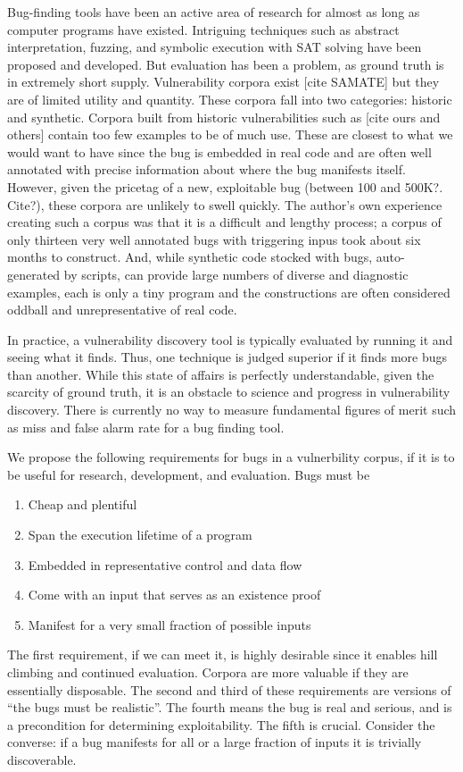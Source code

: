 Bug-finding tools have been an active area of research for almost as long as computer programs have existed. 
Intriguing techniques such as abstract interpretation, fuzzing, and symbolic execution with SAT solving have been proposed and developed.
But evaluation has been a problem, as  ground truth is in extremely short supply.
Vulnerability corpora exist [cite SAMATE] but they are of limited utility and quantity.
These corpora fall into two categories: historic and synthetic.
Corpora built from historic vulnerabilities such as [cite ours and others] contain too few examples to be of much use.
These are closest to what we would want to have since the bug is embedded in real code and are often well annotated with precise information about where the bug manifests itself.
However, given the pricetag of a new, exploitable bug (between 100 and 500K?. Cite?), these corpora are unlikely to swell quickly.
The author's own experience creating such a corpus was that it is a difficult and lengthy process; a corpus of only thirteen very well annotated bugs with triggering inpus took about six months to construct. 
And, while synthetic code stocked with bugs, auto-generated by scripts, can provide large numbers of diverse and diagnostic examples, each is only a tiny program and the constructions are often considered oddball and unrepresentative of real code.

In practice, a vulnerability discovery tool is typically evaluated by running it and seeing what it finds. 
Thus, one technique is judged superior if it finds more bugs than another.
While this state of affairs is perfectly understandable, given the scarcity of ground truth, it is an obstacle to science and progress in vulnerability discovery.
There is currently no way to measure fundamental figures of merit such as miss and false alarm rate for a bug finding tool.

We propose the following requirements for bugs in a vulnerbility corpus, if it is to be useful for research, development, and evaluation.
Bugs must be
\begin{enumerate}
\item Cheap and plentiful
\item Span the execution lifetime of a program
\item Embedded in representative control and data flow
\item Come with an input that serves as an existence proof 
\item Manifest for a very small fraction of possible inputs
\end {enumerate}
The first requirement, if we can meet it, is highly desirable since it enables hill climbing and continued evaluation.
Corpora are more valuable if they are essentially disposable. 
The second and third of these requirements are versions of ``the bugs must be realistic''.
The fourth means the bug is real and serious, and is a precondition for determining exploitability. 
The fifth is crucial.
Consider the converse: if a bug manifests for all or a large fraction of inputs it is trivially discoverable.

